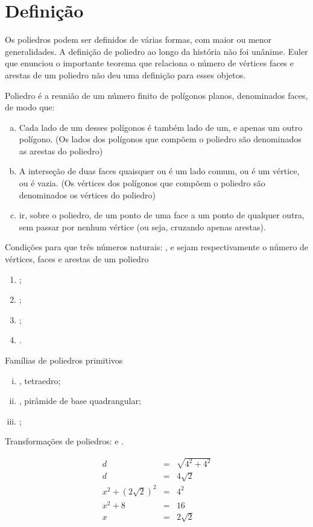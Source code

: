 \documentclass[12pt,a4paper]{article}
\begin{document}
\section{Definição}

Os poliedros podem ser definidos de várias formas, com maior ou menor generalidades. A definição de poliedro ao longo da história não foi unânime. Euler que enunciou o importante teorema que relaciona o número de vértices faces e arestas de um poliedro não deu uma definição para esses objetos.

Poliedro é a reunião de um número finito de polígonos planos, denominados faces, de modo que:

\begin{enumerate}[(a)]
\item Cada lado de um desses polígonos é também lado de um, e apenas um outro polígono. (Os lados dos polígonos que compõem o poliedro são denominados as arestas do poliedro)
\item A interseção de duas faces quaisquer ou é um lado comum, ou é um vértice, ou é vazia. (Os vértices dos polígonos que compõem o poliedro são denominados os vértices do poliedro)
\item ir, sobre o poliedro, de um ponto de uma face a um ponto de qualquer outra, sem passar por nenhum vértice (ou seja, cruzando apenas arestas).
\end{enumerate}

Condições para que três números naturais: ,  e  sejam respectivamente o número de vértices, faces e arestas de um poliedro
\begin{enumerate}[I -]
\item {};
\item {};
\item {};
\item {}.
\end{enumerate}

Famílias de poliedros primitivos
\begin{enumerate}[(i)]
\item {}, tetraedro;
\item {}, pirâmide de base quadrangular;
\item {};
\end{enumerate}

Transformações de poliedros:  e .

\begin{eqnarray}
d & = & \sqrt{4^2+4^2}\\
d & = & 4\sqrt{2} \\
x^2 + (2\sqrt{2})^2 & = & 4^2 \\
x^2 + 8 & = & 16 \\
x & = & 2\sqrt{2}
\end{eqnarray}
\end{document}
